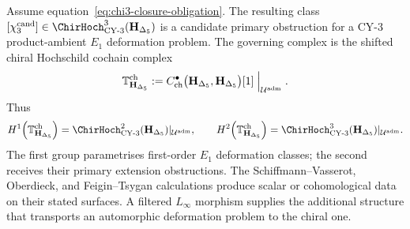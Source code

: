 Assume equation~\eqref{eq:chi3-closure-obligation}.  The resulting
class
\([\chi_3^{\mathrm{cand}}]\in
\ChirHoch^3_{\mathrm{CY\text{-}3}}(\mathbf H_{\Delta_5})\)
is a candidate primary obstruction for a CY-$3$ product-ambient
\(E_1\) deformation problem.  The governing complex is
the shifted chiral Hochschild cochain complex
\begin{equation}
\label{eq:tangent-complex-chirhoch}
 \mathbb T_{\mathbf H_{\Delta_5}}^{\mathrm{ch}}
 :=
 C_{\mathrm{ch}}^\bullet
 \bigl(\mathbf H_{\Delta_5},\mathbf H_{\Delta_5}\bigr)[1]
 \Bigm|_{\mathcal U^{\mathrm{adm}}}.
\end{equation}
Thus
\[
 H^1\!\left(\TangCplx_{\mathbf H_{\Delta_5}}^{\mathrm{ch}}\right)
 =\ChirHoch^2_{\mathrm{CY\text{-}3}}(\mathbf H_{\Delta_5})|_{\Uadm},
 \qquad
 H^2\!\left(\TangCplx_{\mathbf H_{\Delta_5}}^{\mathrm{ch}}\right)
 =\ChirHoch^3_{\mathrm{CY\text{-}3}}(\mathbf H_{\Delta_5})|_{\Uadm}.
\]
The first group parametrises first-order $E_1$ deformation classes;
the second receives their primary extension obstructions.  The
Schiffmann--Vasserot, Oberdieck, and Feigin--Tsygan calculations
produce scalar or cohomological data on their stated surfaces.  A
filtered $L_\infty$ morphism supplies the additional structure that
transports an automorphic deformation problem to the chiral one.

